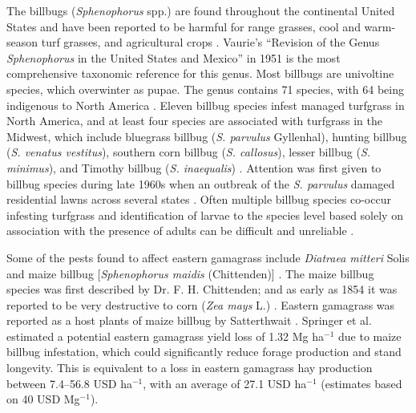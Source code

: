 \documentclass[agronomy,article,submit,moreauthors,pdftex,10pt,a4paper]{mdpi}
\theoremstyle{mdpi}
\newcounter{ex}
\newcounter{re}
\theoremstyle{mdpidefinition}
\begin{document}
The billbugs (\textit{Sphenophorus} spp.) are found throughout the continental United States and have been reported to be harmful for range grasses, cool and warm-season turf grasses, and agricultural crops \cite{sattertjwait1931}. Vaurie’s “Revision of the Genus \textit{Sphenophorus} in the United States and Mexico” in 1951 is the most comprehensive taxonomic reference for this genus. Most billbugs are univoltine species, which overwinter as pupae. The genus contains 71 species, with 64 being indigenous to North America \cite{vaurie}. Eleven billbug species infest managed turfgrass in North America, and at least four species are associated with turfgrass in the Midwest, which include bluegrass billbug (\textit{S. parvulus} Gyllenhal), hunting billbug (\textit{S. venatus vestitus}), southern corn billbug (\textit{S. callosus}), lesser billbug (\textit{S. minimus}), and Timothy billbug (\textit{S. inaequalis}) \cite{kuhn12,richmond}. Attention was first given to billbug species during late 1960s when an outbreak of the \textit{S. parvulus} damaged residential lawns across several states \cite{tashiro70}. Often multiple billbug species co-occur infesting turfgrass and identification of larvae to the species level based solely on association with the presence of adults can be difficult and unreliable \cite{duffy18}.

Some of the pests found to affect eastern gamagrass include \textit{Diatraea mitteri} Solis \cite{solis15} and maize billbug [\textit{Sphenophorus maidis} (Chittenden)] \cite{springer06,maas03}. The maize billbug species was first described by Dr. F. H. Chittenden; and as early as 1854 it was  reported to be very destructive to corn (\textit{Zea mays} L.) \cite{kelly1911}. Eastern gamagrass was reported as a host plants of maize billbug by Satterthwait \cite{sattertjwait1931}. Springer et al. \cite{springer04_1} estimated a potential eastern gamagrass yield loss of 1.32 Mg ha$^{-1}$ due to maize billbug infestation, which could significantly reduce forage production and stand longevity. This is equivalent to a loss in eastern gamagrass hay production between 7.4–56.8 USD ha$^{-1}$, with an average of 27.1 USD ha$^{-1}$ (estimates based on 40 USD Mg$^{-1}$)\cite{springer04_1}.
\end{document}
